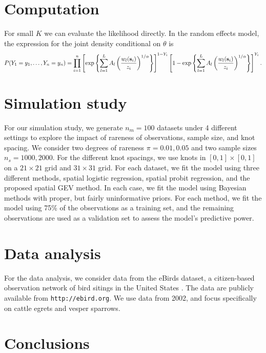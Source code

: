\documentclass[11pt]{article}
\begin{document}
\section{Computation}\label{s:comp}
For small $K$ we can evaluate the likelihood directly.
In the random effects model, the expression for the joint density conditional on $\theta$ is
\begin{align}
	P(Y_1=y_1,\ldots,Y_n=y_n) = \prod_{ i = 1 }^{ n } \left[ \exp \left\{ \sum_{ l = 1 }^{L} A_l \left( \frac{ w_{l}(\mbox{\bf s}_i) }{ z_i } \right)^{ 1/\alpha} \right\} \right]^{ 1 - Y_i } \left[ 1 - \exp \left\{ \sum_{ l = 1 }^{L} A_l \left( \frac{ w_{l}(\mbox{\bf s}_i) }{ z_i } \right)^{ 1/\alpha} \right\} \right]^{ Y_i }.
\end{align}

\section{Simulation study}\label{s:sim}
For our simulation study, we generate $n_m = 100$ datasets under 4 different settings to explore the impact of rareness of observations, sample size, and knot spacing.
We consider two degrees of rareness $\pi = 0.01, 0.05$ and two sample sizes $n_s = 1000, 2000$.
For the different knot spacings, we use knots in $[0, 1] \times [0, 1]$ on a $21 \times 21$ grid and $31 \times 31$ grid.
For each dataset, we fit the model using three different methods, spatial logistic regression, spatial probit regression, and the proposed spatial GEV method.
In each case, we fit the model using Bayesian methods with proper, but fairly uninformative priors.
For each method, we fit the model using 75\% of the observations as a training set, and the remaining observations are used as a validation set to assess the model's predictive power.

\section{Data analysis}\label{s:analysis}
For the data analysis, we consider data from the eBirds dataset, a citizen-based observation network of bird sitings in the United States \citep{Sullivan2009}.
The data are publicly available from {\tt http://ebird.org}.
We use data from 2002, and focus specifically on cattle egrets and vesper sparrows.

\section{Conclusions}\label{s:con}
\end{document}
